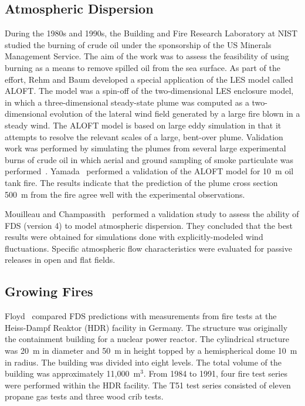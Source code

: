 \subsection{Atmospheric Dispersion}

During the 1980s and 1990s, the Building and Fire Research Laboratory at NIST studied the burning of crude oil under the sponsorship of the US Minerals Management Service. The aim of the work was to assess the feasibility of using burning as a means to remove spilled oil from the sea surface. As part of the effort, Rehm and Baum developed a special application of the LES model called ALOFT. The model was a spin-off of the two-dimensional LES enclosure model, in which a three-dimensional steady-state plume was computed as a two-dimensional evolution of the lateral wind field generated by a large fire blown in a steady wind. The ALOFT model is based on large eddy simulation in that it attempts to resolve the relevant scales of a large, bent-over plume. Validation work was performed by simulating the plumes from several large experimental burns of crude oil in which aerial and ground sampling of smoke    particulate was performed~\cite{McGrattan:4a}. Yamada~\cite{ALOFT:2} performed a validation of the ALOFT model for 10~m oil tank fire. The results indicate that the prediction of the plume cross section 500~m from the fire agree well with the experimental observations.

Mouilleau and Champassith~\cite{JLP:2009} performed a validation study to assess the ability of FDS (version 4) to model atmospheric dispersion. They concluded that the best results were obtained for simulations done with explicitly-modeled wind fluctuations. Specific atmospheric flow characteristics were evaluated for passive releases in open and flat fields.



\subsection{Growing Fires}
\label{growingfires}

Floyd~\cite{Floyd:5,Floyd:6} compared FDS predictions with measurements from fire tests at the Heiss-Dampf Reaktor (HDR) facility in Germany. The structure was originally the containment building for a nuclear power reactor. The cylindrical structure was 20~m in diameter and 50~m in height topped by a hemispherical dome 10~m in radius.  The building was divided into eight levels. The total volume of the building was approximately 11,000~m$^3$. From 1984 to 1991, four fire test series were performed within the HDR facility. The T51 test series consisted of eleven propane gas tests and three wood crib tests. 

